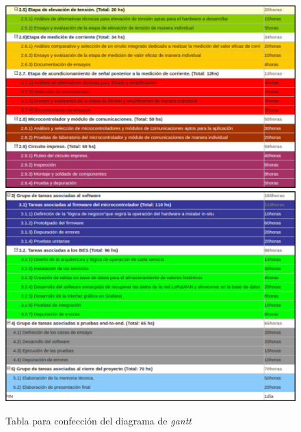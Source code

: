 \documentclass[11pt]{charter}
\begin{document}
\begin{figure}[H]
	\centering 
	\includegraphics[width=\textwidth]{./Figuras/gantt/25-29.png}
	\includegraphics[width=\textwidth]{./Figuras/gantt/3-fin.png}
	\caption{Tabla para confección del diagrama de \textit{gantt}}
	\label{fig:tablegantt1}
\end{figure}
\end{document}
